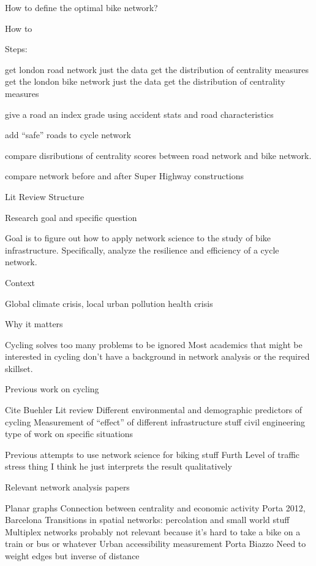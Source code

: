 \documentclass[11pt]{article} %
\begin{document}
How to define the optimal bike network?

How to 




Steps:

	get london road network
		just the data
		get the distribution of centrality measures
	get the london bike network
		just the data
		get the distribution of centrality measures
		
	give a road an index grade
		using accident stats and road characteristics
		
	add ``safe'' roads to cycle network
	
	compare disributions of centrality scores between road network and bike network. 
	
	compare network before and after Super Highway constructions
	
	
	
	
	
Lit Review Structure

	Research goal  and specific question
	
		Goal is to figure out how to apply network science to the study of bike infrastructure. Specifically, analyze the resilience and efficiency of a cycle network. 
	
	Context
	
		Global climate crisis, 
		local urban pollution
		health crisis

	Why it matters
		
		Cycling solves too many problems to be ignored
		Most academics that might be interested in cycling don't have a background in network analysis or the required skillset. 
	
	Previous work on cycling
	
		Cite Buehler Lit review
		Different environmental and demographic predictors of cycling
		Measurement of ``effect'' of different infrastructure stuff
		civil engineering type of work on specific situations
	
	Previous attempts to use network science for biking stuff
		Furth Level of traffic stress thing
			I think he just interprets the result qualitatively
	
	Relevant network analysis papers
		
		Planar graphs
		Connection between centrality and economic activity
			Porta 2012, Barcelona
		Transitions in spatial networks: percolation and small world stuff
		Multiplex networks probably not relevant because it's hard to take a bike on a train or bus or whatever
		Urban accessibility measurement
			Porta 
			Biazzo
			Need to weight edges but inverse of distance
	
\end{document}
